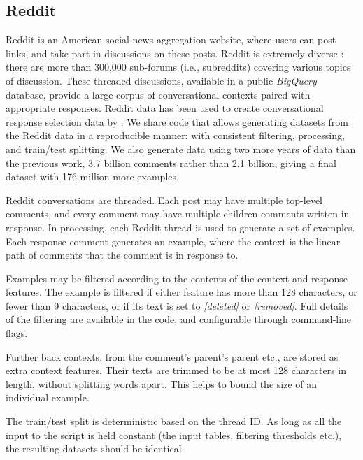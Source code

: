 \documentclass[11pt,a4paper,table]{article}
\begin{document}
\subsection{Reddit}





Reddit is an American social news aggregation website, where users can post links, and take part in discussions on these posts. 
Reddit is extremely diverse \cite{Schrading:2015emnlp,AlRfou:2016arxiv}: there are more  than  300,000 sub-forums (i.e., subreddits) covering various topics of discussion. These threaded discussions, available in a public \emph{BigQuery} database,  provide a large corpus of conversational contexts paired with appropriate responses.  Reddit data has been used to create conversational response selection data by . We share code that allows generating datasets from the Reddit data in a reproducible manner: with consistent filtering, processing, and train/test splitting. We also generate data using two more years of data than the previous work, 3.7 billion comments rather than 2.1 billion, giving a final dataset with 176 million more examples.
 

Reddit conversations are threaded. Each post may have multiple top-level comments, and every comment may have multiple children comments written in response. In processing, each Reddit thread is used to generate a set of examples. Each response comment generates an example, where the context is the linear path of comments that the comment is in response to.

Examples may be filtered according to the contents of the context and response features. The example is filtered if either feature has more than 128 characters, or fewer than 9 characters, or if its text is set to \emph{[deleted]} or \emph{[removed]}. Full details of the filtering are available in the code, and configurable through command-line flags.

Further back contexts, from the comment's parent's parent etc., are stored as extra context features. Their texts are trimmed to be at most 128 characters in length, without splitting words apart. This helps to bound the size of an individual example.

The train/test split is deterministic based on the thread ID. As long as all the input to the script is held constant (the input tables, filtering thresholds etc.), the resulting datasets should be identical.
\end{document}
